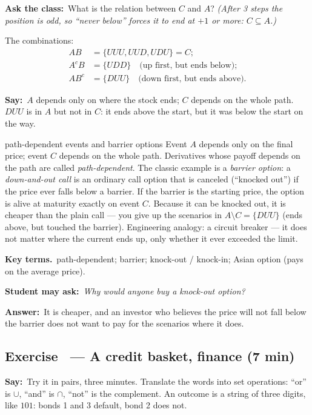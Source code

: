 \documentclass[11pt,a4paper,parskip=half]{scrartcl}
\newcommand{\terms}{\par\textbf{\color{plum}Key terms.}\ }
\newcommand{\sq}[1]{\par\textbf{\color{plum}Student may ask:}\ \emph{#1}\par}
\newcommand{\ans}{\textbf{Answer:}\ }
\newcommand{\say}{\textbf{\color{teal}Say:}\ }
\newcommand{\ask}{\textbf{\color{navy}Ask the class:}\ }
\begin{document}
\ask What is the relation between $C$ and $A$? \emph{(After 3 steps the
position is odd, so ``never below'' forces it to end at $+1$ or more:
$C\subseteq A$.)}

The combinations:
\[ \begin{aligned}
		AB   & =\{UUU,UUD,UDU\}=C;                          \\
		A^cB & =\{UDD\}\quad\text{(up first, but ends below)};   \\
		AB^c & =\{DUU\}\quad\text{(down first, but ends above)}.
	\end{aligned} \]

\say $A$ depends only on where the stock ends; $C$ depends on the whole
path. $DUU$ is in $A$ but not in $C$: it ends above the start, but it was
below the start on the way.

\begin{bg}{path-dependent events and barrier options}
	Event $A$ depends only on the final price; event $C$ depends on the whole
	path. Derivatives whose payoff depends on the path are called
	\emph{path-dependent}. The classic example is a \emph{barrier option}: a
	\emph{down-and-out call} is an ordinary call option that is canceled
	(``knocked out'') if the price ever falls below a barrier. If the barrier
	is the starting price, the option is alive at maturity exactly on event
	$C$. Because it can be knocked out, it is cheaper than the plain call ---
	you give up the scenarios in $A\setminus C=\{DUU\}$ (ends above, but
	touched the barrier). Engineering analogy: a circuit breaker --- it does
	not matter where the current ends up, only whether it ever exceeded the
	limit.

	\terms path-dependent; barrier; knock-out / knock-in; Asian option (pays
	on the average price).

	\sq{Why would anyone buy a knock-out option?}
	\ans It is cheaper, and an investor who believes the price will not fall
	below the barrier does not want to pay for the scenarios where it does.
\end{bg}

\subsection{Exercise~ --- A credit basket, finance (7 min)}


\say Try it in pairs, three minutes. Translate the words into set
operations: ``or'' is $\cup$, ``and'' is $\cap$, ``not'' is the complement.
An outcome is a string of three digits, like $101$: bonds 1 and 3 default,
bond 2 does not.
\end{document}
